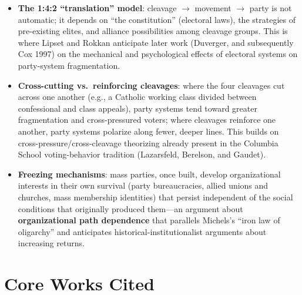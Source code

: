 \documentclass[12pt]{article}
\begin{document}
\begin{itemize}[leftmargin=*, itemsep=4pt]
    \item \textbf{The 1:4:2 ``translation'' model}: cleavage $\to$ movement $\to$ party is not automatic; it depends on ``the constitution'' (electoral laws), the strategies of pre-existing elites, and alliance possibilities among cleavage groups. This is where Lipset and Rokkan anticipate later work (Duverger, and subsequently Cox 1997) on the mechanical and psychological effects of electoral systems on party-system fragmentation.
    \item \textbf{Cross-cutting vs.\ reinforcing cleavages}: where the four cleavages cut across one another (e.g., a Catholic working class divided between confessional and class appeals), party systems tend toward greater fragmentation and cross-pressured voters; where cleavages reinforce one another, party systems polarize along fewer, deeper lines. This builds on cross-pressure/cross-cleavage theorizing already present in the Columbia School voting-behavior tradition (Lazarsfeld, Berelson, and Gaudet).
    \item \textbf{Freezing mechanisms}: mass parties, once built, develop organizational interests in their own survival (party bureaucracies, allied unions and churches, mass membership identities) that persist independent of the social conditions that originally produced them---an argument about \textbf{organizational path dependence} that parallels Michels's ``iron law of oligarchy'' and anticipates historical-institutionalist arguments about increasing returns.
\end{itemize}

\section{Core Works Cited}
\end{document}
